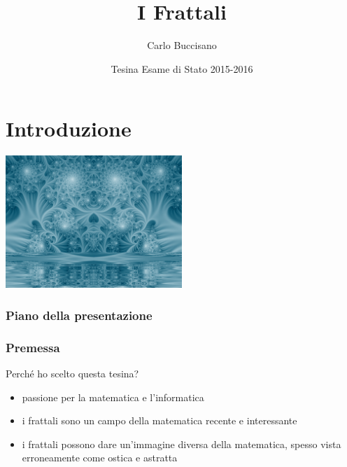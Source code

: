 \documentclass{beamer}
\title{I Frattali}
\author{Carlo Buccisano}
\date{Tesina Esame di Stato 2015-2016}
\institute{Liceo Scientifico F. Lussana}
\begin{document}
	\section{Introduzione}
		\begin{frame}
			\begin{center}
				\includegraphics[width=0.5\textwidth]{"../Copertina/blue_lagoon"}
			\end{center}
			\maketitle
		\end{frame}
		\begin{frame}
			\frametitle{Piano della presentazione}
			\tableofcontents
		\end{frame}
		\begin{frame}
			\frametitle{Premessa}
			Perché ho scelto questa tesina?
			\begin{itemize}
				\item passione per la matematica e l'informatica
				\item i frattali sono un campo della matematica recente e interessante
				\item i frattali possono dare un'immagine diversa della matematica, spesso vista erroneamente come ostica e astratta
			\end{itemize}
		\end{frame}
\end{document}

